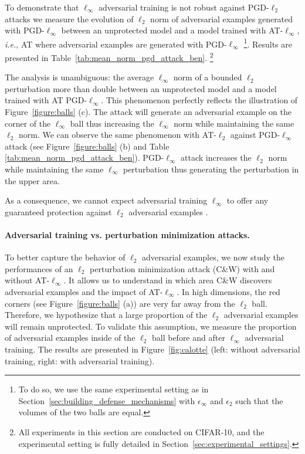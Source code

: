 To demonstrate that $\ell_\infty$ adversarial training is not robust against PGD-$\ell_2$ attacks we measure the evolution of $\ell_2$ norm of adversarial examples generated with PGD-$\ell_\infty$ between an unprotected model and a model trained with AT-$\ell_\infty$, \emph{i.e.}, AT where adversarial examples are generated with PGD-$\ell_\infty$ \footnote{To do so, we use the same experimental setting as in Section~\ref{sec:building_defense_mechanisms} with $\epsilon_\infty$ and $\epsilon_2$ such that the volumes of the two balls are equal.}. 
Results are presented in  Table~\ref{tab:mean_norm_pgd_attack_ben}. \footnote{All experiments in this section are conducted on CIFAR-10, and the experimental setting is fully detailed in Section~\ref{sec:experimental_settings}. }

The analysis is unambiguous: the average $\ell_\infty$ norm of a bounded $\ell_2$ perturbation more than double between an unprotected model and a model trained with AT PGD-$\ell_\infty$. This phenomenon perfectly reflects the illustration of Figure~\ref{figure:balls} (c). The attack will generate an adversarial example on the corner of the $\ell_\infty$ ball thus increasing the $\ell_\infty$ norm while maintaining the same $\ell_2$ norm. 
We can observe the same phenomenon with AT-$\ell_2$ against PGD-$\ell_\infty$ attack (see Figure~\ref{figure:balls} (b) and Table \ref{tab:mean_norm_pgd_attack_ben}). PGD-$\ell_\infty$ attack increases the $\ell_2$ norm while maintaining the same $\ell_\infty$ perturbation thus generating the perturbation in the upper area. 

As a consequence, we cannot expect adversarial training $\ell_\infty$ to offer any guaranteed protection against $\ell_2$ adversarial examples .

\paragraph{Adversarial training vs. perturbation minimization attacks.}
To better capture the behavior of $\ell_2$ adversarial examples, we now study the performances of an $\ell_2$ perturbation minimization attack (C\&W) with and without AT-$\ell_\infty$. It allows us to understand in which area C\&W discovers adversarial examples and the impact of AT-$\ell_\infty$. In high dimensions, the red corners (see Figure~\ref{figure:balls} (a)) are very far away from the $\ell_2$ ball. Therefore, we hypothesize that a large proportion of the $\ell_2$ adversarial examples will remain unprotected. To validate this assumption, we measure the proportion of adversarial examples inside of the $\ell_2$ ball before and after $\ell_\infty$ adversarial training. The results are presented in Figure~\ref{fig:calotte} (left: without adversarial training, right: with adversarial training). 

